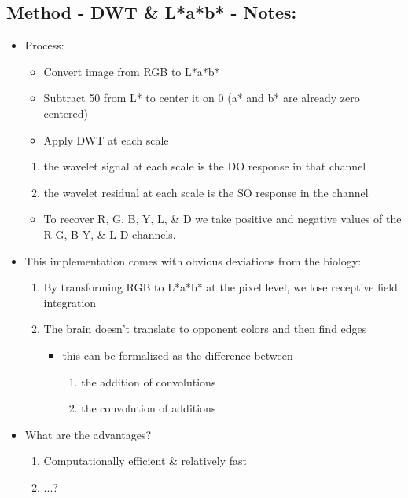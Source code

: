 \documentclass[journal,onecolumn]{IEEEtran}
\begin{document}
\subsection*{Method - DWT \& L*a*b* - Notes:}
\begin{itemize}
    \item Process:
    \begin{itemize}
        \item Convert image from RGB to L*a*b*
        \item Subtract 50 from L* to center it on 0 (a* and b* are already zero centered)
        \item Apply DWT at each scale
    \end{itemize}
    \begin{enumerate}
        \item the wavelet signal at each scale is the DO response in that channel
        \item the wavelet residual at each scale is the SO response in the channel
    \end{enumerate}
    \begin{itemize}
        \item To recover R, G, B, Y, L, \& D we take positive and negative values of the R-G, B-Y, \& L-D channels.
    \end{itemize}
    \item This implementation comes with obvious deviations from the biology:
    \begin{enumerate}
        \item By transforming RGB to L*a*b* at the pixel level, we lose receptive field integration
        \item The brain doesn't translate to opponent colors and then find edges
        \begin{itemize}
            \item this can be formalized as the difference between
            \begin{enumerate}
                \item the addition of convolutions
                \item the convolution of additions
            \end{enumerate}
        \end{itemize}
    \end{enumerate}
    \item What are the advantages?
    \begin{enumerate}
        \item Computationally efficient \& relatively fast
        \item ...?
    \end{enumerate}
\end{itemize}
\end{document}

